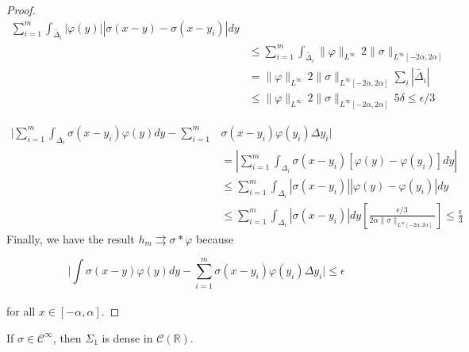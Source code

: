 \documentclass[../main.tex]{subfiles}
\begin{document}
\begin{proof}
		
		\begin{equation*}
			\begin{split}
				\sum_{i=1}^m  \int_{\tilde{\Delta_i}} \left| \varphi(y)\right| \left| \sigma(x-y)-\sigma(x-y_i)\right|dy & \\
				&  \leq  \sum_{i=1}^m  \int_{\tilde{\Delta_i}} \| \varphi\|_{L^{\infty}} \, 2 \| \sigma \|_{L^{\infty}[-2\alpha,2\alpha]} \\
				& = \| \varphi\|_{L^{\infty}} \, 2 \| \sigma \|_{L^{\infty}[-2\alpha,2\alpha]} \sum_i| \tilde{\Delta_i} | \\
				& \leq \| \varphi\|_{L^{\infty}} \, 2 \| \sigma \|_{L^{\infty}[-2\alpha,2\alpha]} \, 5 \delta \leq \epsilon /3
			\end{split}
		\end{equation*}

\begin{equation*} 
	\begin{split}
		\Bigg| \sum_{i=1}^m \int_{\Delta_i} \sigma(x-y_i)\varphi(y)dy -  \sum_{i=1}^m &\sigma(x-y_i) \varphi(y_i)\Delta y_i \Bigg| \\
		& =  \left|  \sum_{i=1}^m \int_{\Delta_i} \sigma(x-y_i) [\varphi(y)-\varphi(y_i)] dy \right| \\
		& \leq  \sum_{i=1}^m \int_{\Delta_i}  \left| \sigma(x-y_i)\right| \left| \varphi(y) - \varphi(y_i)\right|dy  \\
		& \leq  \sum_{i=1}^m \int_{\Delta_i}  \left| \sigma(x-y_i)\right| dy \left[ \frac{\epsilon/3}{2\alpha \| \sigma\|_{L^\infty[-2\alpha,2\alpha]}}\right]  \leq \frac{\epsilon}{3} 
	\end{split}
\end{equation*}
Finally, we have the result $h_m \rightrightarrows \sigma \ast \varphi $ because

$$\Bigg| \int \sigma(x-y)\varphi(y)dy -  \sum_{i=1}^m \sigma(x-y_i) \varphi(y_i) \Delta y_i \Bigg| \leq \epsilon $$
\\ for all $x\in [-\alpha,\alpha ].$
	\end{proof}
	\vspace{\baselineskip} 
	\begin{lema} %
		If $\sigma \in \mathcal{C}^{\infty}$, then $ \Sigma_1$ is dense in  $\mathcal{C}(\mathbb{R})$.
	\end{lema}
	
\end{document}
